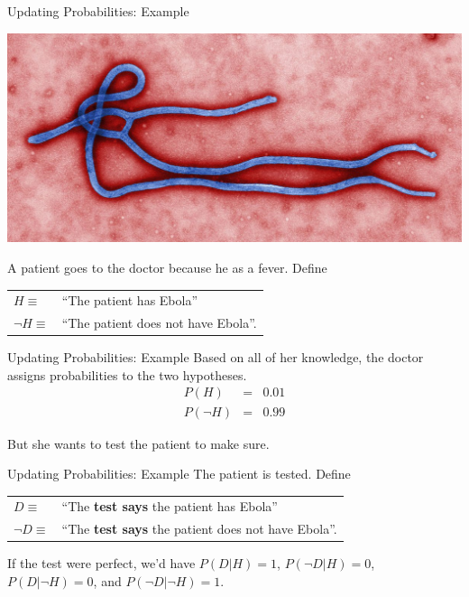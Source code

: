 \documentclass{beamer}
\begin{document}
\begin{frame}[t]{Updating Probabilities: Example}
\begin{center}
\includegraphics[scale=0.5]{ebola.jpg}
\end{center}
A patient goes to the doctor because he as a fever. Define
\begin{center}
\begin{tabular}{ll}
$H \equiv $ & ``The patient has Ebola''\\
$\neg H \equiv $ & ``The patient does not have Ebola''.
\end{tabular}
\end{center}

\end{frame}

\begin{frame}[t]{Updating Probabilities: Example}
Based on all of her knowledge, the doctor assigns probabilities to the two
hypotheses.
\begin{eqnarray*}
P(H) &=& 0.01\\
P(\neg H) &=& 0.99
\end{eqnarray*}

But she wants to test the patient to make sure.
\end{frame}



\begin{frame}[t]{Updating Probabilities: Example}
The patient is tested. Define

\begin{center}
\begin{tabular}{ll}
$D \equiv $ & ``The {\bf test says} the patient has Ebola''\\
$\neg D \equiv $ & ``The {\bf test says} the patient does not have Ebola''.
\end{tabular}
\end{center}

If the test were perfect, we'd have $P(D | H) = 1$, $P(\neg D | H) = 0$,
$P(D | \neg H) = 0$, and $P(\neg D | \neg H) = 1$.
\end{frame}
\end{document}
